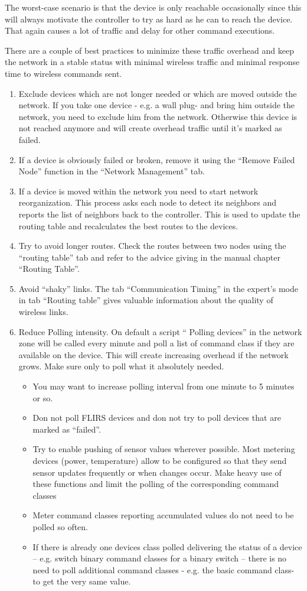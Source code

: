 The worst-case scenario is that the device is only reachable occasionally since this will always motivate the controller to try as hard as he can 
to reach the  device. That again causes a lot of traffic and delay for other command executions.

There are a couple of best practices to minimize these traffic overhead and keep the network in a stable status with minimal wireless traffic and minimal response
  time to wireless commands sent.
\begin{enumerate}
\item Exclude devices which are not longer needed or which are moved outside the network. If you take one device  - e.g. a wall plug- and bring him outside the 
  network, you need to exclude him from the network. Otherwise this device is not reached anymore and will create overhead traffic until it’s marked as failed.
\item If a device is obviously failed or broken, remove it using the “Remove Failed Node” function in the “Network Management” tab.
\item If a device is moved within the network you need to start network reorganization. This process asks each node to detect its neighbors 
and reports the list of neighbors back to the controller. This is used to update the routing table and recalculates the best routes to the devices.
\item Try to avoid longer routes. Check the routes between two nodes using the “routing table” tab and refer to the advice giving in the manual chapter “Routing Table”.
\item Avoid “shaky” links. The tab “Communication Timing” in the expert’s mode in tab “Routing table” gives valuable information about the quality of wireless links. 
\item Reduce Polling intensity. On default a script “ Polling devices” in the network zone will be called every minute and poll a list of command class if they are available on the device. This will create increasing overhead if the network grows.  Make sure only to poll what it absolutely needed.
 \begin{itemize}
\item You may want to increase polling interval from one minute to 5 minutes or so.
\item Don not poll FLIRS devices and don not try to poll devices that are marked as “failed”.
\item Try to enable pushing of sensor values wherever possible. Most metering devices (power, temperature) allow to be configured so that they 
send sensor updates frequently or when changes occur. Make heavy use of these functions and limit the polling of the corresponding command classes
\item Meter command classes reporting accumulated values do not need to be polled so often.
\item If there is already one devices class polled delivering the status of a device – e.g. switch binary command classes for a binary switch – there is no need to poll additional command classes  - e.g. the basic command class- to get the very same value. 
 \end{itemize} 
\end{enumerate}
